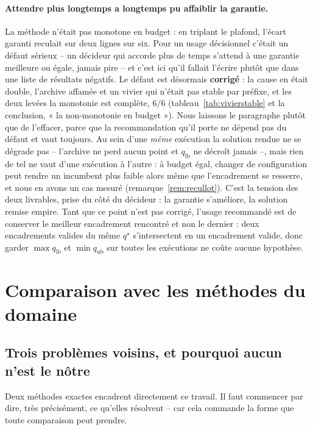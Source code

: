 \documentclass[11pt,a4paper]{article}
\theoremstyle{plain}
\theoremstyle{remark}
\newcommand{\qs}{q^{\star}}
\begin{document}
\paragraph{Attendre plus longtemps a longtemps pu affaiblir la garantie.}
La méthode n'était pas monotone en budget : en triplant le plafond, l'écart
garanti reculait sur deux lignes sur six. Pour un usage décisionnel c'était
un défaut sérieux -- un décideur qui accorde plus de temps s'attend à une
garantie meilleure ou égale, jamais pire -- et c'est ici qu'il fallait
l'écrire plutôt que dans une liste de résultats négatifs. Le défaut est
désormais \textbf{corrigé} : la cause en était double, l'archive affamée et
un vivier qui n'était pas stable par préfixe, et les deux levées la
monotonie est complète, $6/6$ (tableau~\ref{tab:vivierstable} et la
conclusion, « la non-monotonie en budget »). Nous laissons le paragraphe
plutôt que de l'effacer, parce que la recommandation qu'il porte ne dépend
pas du défaut et vaut toujours. Au sein d'une
\emph{même} exécution la solution rendue ne se dégrade pas -- l'archive ne
perd aucun point et $q_{\text{lb}}$ ne décroît jamais --, mais rien de tel
ne vaut d'une exécution à l'autre : à budget égal, changer de configuration
peut rendre un incumbent plus faible alors même que l'encadrement se
resserre, et nous en avons un cas mesuré (remarque~\ref{rem:recullot}).
C'est la tension des deux livrables, prise du côté du décideur : la
garantie s'améliore, la solution remise empire. Tant que ce point n'est pas corrigé, l'usage recommandé est de conserver le meilleur encadrement rencontré et non le dernier : deux encadrements valides du même $\qs$ s'intersectent en un encadrement valide, donc garder $\max q_{\text{lb}}$ et $\min q_{\text{ub}}$ sur toutes les exécutions ne coûte aucune hypothèse.

\section{Comparaison avec les méthodes du domaine}
\label{sec:compar}
\label{sec:comparaison}

\subsection{Trois problèmes voisins, et pourquoi aucun n'est le nôtre}

Deux méthodes exactes encadrent directement ce travail. Il faut commencer
par dire, très précisément, ce qu'elles résolvent -- car cela commande la
forme que toute comparaison peut prendre.
\end{document}
